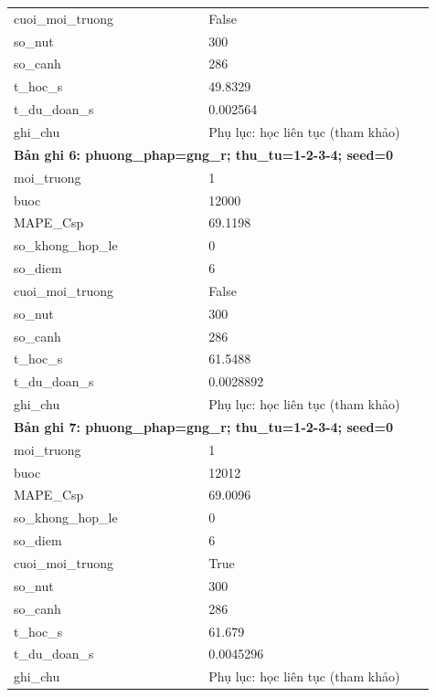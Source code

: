 \begin{longtable}{p{0.43\linewidth}p{0.50\linewidth}}
cuoi\_\allowbreak moi\_\allowbreak truong & False \\
so\_\allowbreak nut & 300 \\
so\_\allowbreak canh & 286 \\
t\_\allowbreak hoc\_\allowbreak s & 49.8329 \\
t\_\allowbreak du\_\allowbreak doan\_\allowbreak s & 0.002564 \\
ghi\_\allowbreak chu & Phụ lục: học liên tục (tham khảo) \\
\midrule
\multicolumn{2}{p{0.95\linewidth}}{\textbf{Bản ghi 6: phuong\_phap=gng\_r; thu\_tu=1-2-3-4; seed=0}} \\
moi\_\allowbreak truong & 1 \\
buoc & 12000 \\
MAPE\_\allowbreak Csp & 69.1198 \\
so\_\allowbreak khong\_\allowbreak hop\_\allowbreak le & 0 \\
so\_\allowbreak diem & 6 \\
cuoi\_\allowbreak moi\_\allowbreak truong & False \\
so\_\allowbreak nut & 300 \\
so\_\allowbreak canh & 286 \\
t\_\allowbreak hoc\_\allowbreak s & 61.5488 \\
t\_\allowbreak du\_\allowbreak doan\_\allowbreak s & 0.0028892 \\
ghi\_\allowbreak chu & Phụ lục: học liên tục (tham khảo) \\
\midrule
\multicolumn{2}{p{0.95\linewidth}}{\textbf{Bản ghi 7: phuong\_phap=gng\_r; thu\_tu=1-2-3-4; seed=0}} \\
moi\_\allowbreak truong & 1 \\
buoc & 12012 \\
MAPE\_\allowbreak Csp & 69.0096 \\
so\_\allowbreak khong\_\allowbreak hop\_\allowbreak le & 0 \\
so\_\allowbreak diem & 6 \\
cuoi\_\allowbreak moi\_\allowbreak truong & True \\
so\_\allowbreak nut & 300 \\
so\_\allowbreak canh & 286 \\
t\_\allowbreak hoc\_\allowbreak s & 61.679 \\
t\_\allowbreak du\_\allowbreak doan\_\allowbreak s & 0.0045296 \\
ghi\_\allowbreak chu & Phụ lục: học liên tục (tham khảo) \\

\end{longtable}
